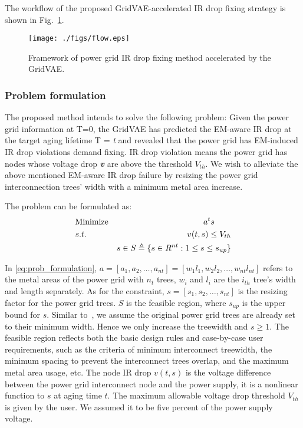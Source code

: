 The workflow of the proposed GridVAE-accelerated IR drop fixing strategy is shown in Fig.~\ref{fig:flow}. 


\begin{figure}[h!]
	\centering
	\texttt{[image: ./figs/flow.eps]}
	\caption{Framework of power grid IR drop fixing method accelerated by the GridVAE.}
	\label{fig:flow}
\end{figure}

\subsubsection{Problem formulation}
\label{subsubsec:formulation}
The proposed method intends to solve the following problem: 
Given the power grid information at T=0, the GridVAE has predicted the EM-aware IR drop at the target aging lifetime T = \textit{t} and revealed that the power grid has EM-induced IR drop violations demand fixing. IR drop violation means the power grid  has nodes whose voltage drop \textit{\textbf{v}} are above the threshold $V_{th}$.
We wish to alleviate the above mentioned EM-aware IR drop failure by resizing the power grid interconnection trees' width with a minimum metal area increase.

The problem can be formulated as:
\begin{align}
	\label{eq:prob_formulation}
	&\mbox{Minimize}  & a^{t}s \qquad   \notag  \\
	&s.t.     & v(t,s)\leq V_{th} \\
	& \quad   &s \in S   \triangleq \{ s \in R^{nt}: 1 \leq s \leq s_{up} \}        \notag
\end{align}

In \eqref{eq:prob_formulation}, $a=[a_{1},a_{2},\ldots,a_{nt}] = [w_{1}l_{1},w_{2}l_{2},\ldots,w_{nt}l_{nt}]$ refers to the metal areas of the power grid with $n_{t}$ trees, $w_{i}$ and $l_{i}$ are the $i_{th}$ tree's width and length separately.
As for the constraint, $s=[s_{1},s_{2},\ldots,s_{nt}]$  is the resizing factor for the power grid trees. $S$ is the feasible region, where $s_{up}$ is the upper bound for $s$. Similar to~\cite{Sukharev:2019pg}, we assume the original power grid trees are already set to their minimum width. Hence we only increase the treewidth and $s \geq 1 $.
The feasible region reflects both the basic design rules and case-by-case user requirements, such as the criteria of minimum interconnect treewidth, the minimum spacing to prevent the interconnect trees overlap, and the maximum metal area usage, etc. 
The node IR drop $v(t,s)$ is the voltage difference between the power grid interconnect node and the power supply, it is a nonlinear function to $s$ at aging time $t$. The maximum allowable voltage drop threshold $V_{th}$ is given by the user. We assumed it to be five percent of the power supply voltage.


